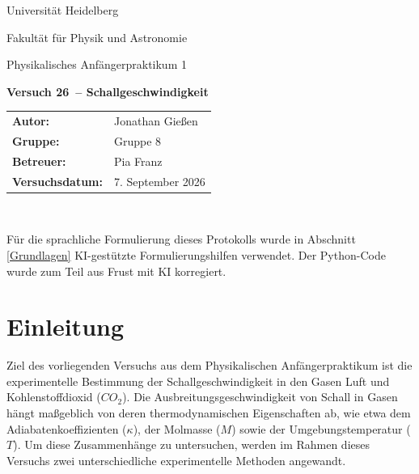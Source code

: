 \documentclass[12pt,a4paper,titlepage]{scrartcl}
\numberwithin{equation}{section}
\numberwithin{table}{section}
\numberwithin{figure}{section}
\newcommand{\versuch}{Versuch 26}
\newcommand{\titel}{Schallgeschwindigkeit}
\newcommand{\praktikum}{Physikalisches Anfängerpraktikum 1}
\newcommand{\autor}{Jonathan Gießen}
\newcommand{\gruppe}{Gruppe 8}
\newcommand{\datum}{7. September 2026}
\newcommand{\betreuer}{Pia Franz}
\begin{document}
\pagestyle{scrheadings}

\begin{titlepage}



    \centering
    \vspace*{4cm}
    {\large Universität Heidelberg\par}
    {\small Fakultät für Physik und Astronomie\par}
    {\Large \praktikum\par}
    \vspace{0.8cm}
    {\LARGE \bfseries \versuch\ -- \titel\par}
    \vspace{1.5cm}

    \begin{tabular}{ll}
        \textbf{Autor:} & \autor\\
        \textbf{Gruppe:} & \gruppe\\
        \textbf{Betreuer:} & \betreuer\\
        \textbf{Versuchsdatum:} & \datum\\
    \end{tabular}

    \vfill
    \hrulefill\
\end{titlepage}

\tableofcontents

\bigskip
\begin{tcolorbox}[colback=gray!5,colframe=gray!60,boxrule=0.8pt,arc=0.01mm,title=KI-Hinweis]
    Für die sprachliche Formulierung dieses Protokolls wurde in Abschnitt \ref{Grundlagen} KI-gestützte Formulierungshilfen verwendet. Der Python-Code wurde zum Teil aus Frust mit KI korregiert. 
\end{tcolorbox}


\clearpage
\section{Einleitung}
Ziel des vorliegenden Versuchs aus dem Physikalischen Anfängerpraktikum ist die experimentelle Bestimmung der Schallgeschwindigkeit in den Gasen Luft und Kohlenstoffdioxid ($CO_2$). Die Ausbreitungsgeschwindigkeit von Schall in Gasen hängt maßgeblich von deren thermodynamischen Eigenschaften ab, wie etwa dem Adiabatenkoeffizienten ($\kappa$), der Molmasse ($M$) sowie der Umgebungstemperatur ($T$). Um diese Zusammenhänge zu untersuchen, werden im Rahmen dieses Versuchs zwei unterschiedliche experimentelle Methoden angewandt.
\end{document}
